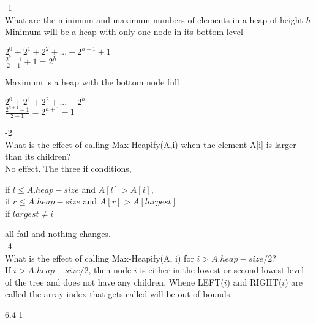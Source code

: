 \documentclass[12pt,largemargins]{homework}
\begin{document}
\maketitle
{}-1\\
What are the minimum and maximum numbers of elements in a heap of height $ h $\\
Minimum will be a heap with only one node in its bottom level\\
\begin{center}
$ 2^0 + 2^1 + 2^2 + ... + 2^{h-1} + 1 $\\
$ \frac{2^{h} - 1 }{2 - 1} + 1 = 2^h$\\
\end{center}
Maximum is a heap with the bottom node full\\
\begin{center}
$ 2^0 + 2^1 + 2^2 + ... + 2^{h}$\\
$ \frac{2^{h+1} - 1}{2 - 1}  = 2^{h + 1} -1$\\
\end{center}
-2\\
What is the effect of calling Max-Heapify(A,i) when the element A[i] is larger than its children?\\

No effect. The three if conditions,
\begin{center}
if $ l \leq A.heap - size $ and $ A[l] >A[i] $,\\
if $ r \leq A.heap - size $ and $ A[r] > A[largest] $\\
if $ largest \neq i $ \\
\end{center}
all fail and nothing changes.\\

-4\\
What is the effect of calling Max-Heapify(A, i) for $ i > A.heap-size/2$?\\

If $ i > A.heap-size/2 $, then node $ i $ is either in the lowest or second lowest level of the tree and does not have any children. Whene LEFT($ i $) and RIGHT($ i $) are called the array index that gets called will be out of bounds.\\

\question

6.4-1\\
\end{document}
